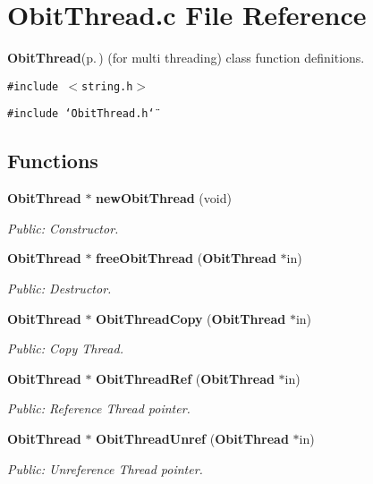 \section{Obit\-Thread.c File Reference}
\label{ObitThread_8c}
{\bf Obit\-Thread}{\rm (p.\,\pageref{structObitThread})} (for multi threading) class function definitions. 

{\tt \#include $<$string.h$>$}\par
{\tt \#include \char`\"{}Obit\-Thread.h\char`\"{}}\par
\subsection*{Functions}
\begin{CompactItemize}
\item 
{\bf Obit\-Thread} $\ast$ {\bf new\-Obit\-Thread} (void)
\begin{CompactList}\small\item\em Public: Constructor. \item\end{CompactList}\item 
{\bf Obit\-Thread} $\ast$ {\bf free\-Obit\-Thread} ({\bf Obit\-Thread} $\ast$in)
\begin{CompactList}\small\item\em Public: Destructor. \item\end{CompactList}\item 
{\bf Obit\-Thread} $\ast$ {\bf Obit\-Thread\-Copy} ({\bf Obit\-Thread} $\ast$in)
\begin{CompactList}\small\item\em Public: Copy Thread. \item\end{CompactList}\item 
{\bf Obit\-Thread} $\ast$ {\bf Obit\-Thread\-Ref} ({\bf Obit\-Thread} $\ast$in)
\begin{CompactList}\small\item\em Public: Reference Thread pointer. \item\end{CompactList}\item 
{\bf Obit\-Thread} $\ast$ {\bf Obit\-Thread\-Unref} ({\bf Obit\-Thread} $\ast$in)
\begin{CompactList}\small\item\em Public: Unreference Thread pointer. \item\end{CompactList}\item 

\end{CompactItemize}
